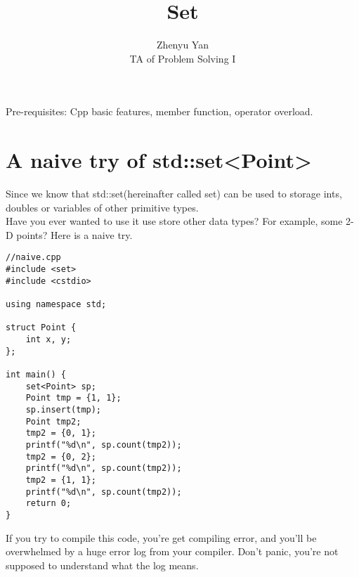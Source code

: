 \documentclass{article}
\title{Set}
\author{Zhenyu Yan\\TA of Problem Solving I}
\date{}
\begin{document}
\maketitle
Pre-requisites: Cpp basic features, member function, operator overload.
\section{A naive try of std::set<Point>}
Since we know that std::set(hereinafter called set) can be used to storage ints, doubles or variables of other primitive types.\\
Have you ever wanted to use it use store other data types? For example, some 2-D points?
Here is a naive try.
\begin{lstlisting}
//naive.cpp
#include <set>
#include <cstdio>

using namespace std;

struct Point {
    int x, y;
};

int main() {
    set<Point> sp;
    Point tmp = {1, 1};
    sp.insert(tmp);
    Point tmp2;
    tmp2 = {0, 1};
    printf("%d\n", sp.count(tmp2));
    tmp2 = {0, 2};
    printf("%d\n", sp.count(tmp2));
    tmp2 = {1, 1};
    printf("%d\n", sp.count(tmp2));
    return 0;
}
\end{lstlisting}
If you try to compile this code, you're get compiling error, and you'll be overwhelmed by a huge error log from your compiler. Don't panic, you're not supposed to understand what the log means.
\newpage
\end{document}
